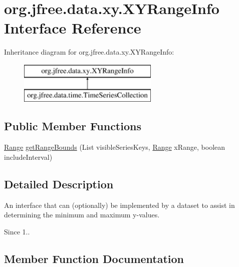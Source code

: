\hypertarget{interfaceorg_1_1jfree_1_1data_1_1xy_1_1_x_y_range_info}{}\section{org.\+jfree.\+data.\+xy.\+X\+Y\+Range\+Info Interface Reference}
\label{interfaceorg_1_1jfree_1_1data_1_1xy_1_1_x_y_range_info}
Inheritance diagram for org.\+jfree.\+data.\+xy.\+X\+Y\+Range\+Info\+:\begin{figure}[H]
\begin{center}
\leavevmode
\includegraphics[height=2.000000cm]{interfaceorg_1_1jfree_1_1data_1_1xy_1_1_x_y_range_info}
\end{center}
\end{figure}
\subsection*{Public Member Functions}
\begin{DoxyCompactItemize}
\item 
\mbox{\hyperlink{classorg_1_1jfree_1_1data_1_1_range}{Range}} \mbox{\hyperlink{interfaceorg_1_1jfree_1_1data_1_1xy_1_1_x_y_range_info_a057845002212fdaf495e6157bb170584}{get\+Range\+Bounds}} (List visible\+Series\+Keys, \mbox{\hyperlink{classorg_1_1jfree_1_1data_1_1_range}{Range}} x\+Range, boolean include\+Interval)
\end{DoxyCompactItemize}


\subsection{Detailed Description}
An interface that can (optionally) be implemented by a dataset to assist in determining the minimum and maximum y-\/values.

\begin{DoxySince}{Since}
1.. 
\end{DoxySince}


\subsection{Member Function Documentation}
\mbox{\label{interfaceorg_1_1jfree_1_1data_1_1xy_1_1_x_y_range_info_a057845002212fdaf495e6157bb170584}} 
